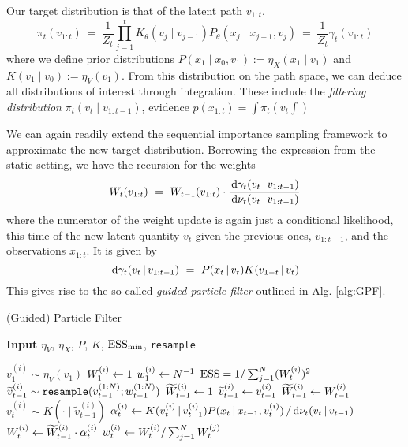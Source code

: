 Our target distribution is that of the latent path $v_{1:t}$,
\begin{equation*}
\pi_t(v_{1:t}) ~ = ~ \frac{1}{Z_t} \prod_{j=1}^t K_\theta(v_j \mid v_{j-1}) P_\theta(x_j \mid x_{j-1}, v_j) ~ = ~ \frac{1}{Z_t} \gamma_t(v_{1:t})
\end{equation*}
where we define prior distributions $P(x_1 \mid x_0, v_1) := \eta_X(x_1 \mid v_1)$ and $K(v_1 \mid v_0) := \eta_V(v_1)$. From this distribution on the path space, we can deduce all distributions of interest through integration. These include the \emph{filtering distribution} $\pi_t(v_t \mid v_{1:t-1})$, evidence $p(x_{1:t}) = \int \pi_t(v_t \int)$

We can again readily extend the sequential importance sampling framework to approximate the new target distribution. Borrowing the expression from the static setting, we have the recursion for the weights
\begin{equation*}
W_t(v_{1:t}) ~ = ~ W_{t-1}(v_{1:t}) \cdot \frac{\, \textrm{d} \gamma_t(v_t \,|\, v_{1:t-1})}{\, \textrm{d} \nu_t(v_t \,|\, v_{1:t-1})}
\end{equation*}
where the numerator of the weight update is again just a conditional likelihood, this time of the new latent quantity $v_t$ given the previous ones, $v_{1:t-1}$, and the observations $x_{1:t}$. It is given by
\begin{equation*}
\, \textrm{d} \gamma_t(v_t \,|\, v_{1:t-1}) ~ = ~ P(x_t \,|\, v_t) K(v_{1-t} \,|\, v_t)
\end{equation*}
This gives rise to the so called \emph{guided particle filter} outlined in Alg. \ref{alg:GPF}.

\begin{algorithm}
\label{alg:GPF}
\caption{(Guided) Particle Filter}
\hspace*{\algorithmicindent} \textbf{Input} $\eta_V$, $\eta_X$, $P$, $K$, $\textrm{ESS}_\textrm{min}$, \texttt{resample}
\begin{algorithmic}
\State $v_1^{(i)} \sim \eta_V(v_1)$ 
\State $W_1^{(i)} \leftarrow 1$ 
\State $w_1^{(i)} \leftarrow N^{-1}$
	\State $\textrm{ESS} = 1 / \sum_{j=1}^N (W_t^{(i)})^2$ 
	\If{$\ESS < \ESSmin$}
		\State $\widetilde{v}_{t-1}^{(i)} \sim \texttt{resample}(v_{t-1}^{(1:N)}; w_{t-1}^{(1:N)})$ 
		\State $\widetilde{W}_{t-1}^{(i)} \leftarrow 1$ 
	\Else
		\State $\widetilde{v}_{t-1}^{(i)} \leftarrow v_{t-1}^{(i)}$ 
		\State $\widetilde{W}_{t-1}^{(i)} \leftarrow W_{t-1}^{(i)}$ 
	\EndIf
\State $v_t^{(i)} \sim K(\cdot \mid \widetilde{v}_{t-1}^{(i)})$ 
\State $\alpha_t^{(i)} \leftarrow K(v_t^{(i)} \,|\, v_{t-1}^{(i)}) P(x_t \,|\, x_{t-1}, v_t^{(i)}) \, / \, \textrm{d} \nu_t(v_t \,|\, v_{t-1})$ 
\State $W_t^{(i)} \leftarrow \widetilde{W}_{t-1}^{(i)} \cdot \alpha_t^{(i)}$ 
\State $w_t^{(i)} \leftarrow W_t^{(i)} / \sum_{j=1}^N W_t^{(j)}$ 
\EndFor
\end{algorithmic}
\end{algorithm}

